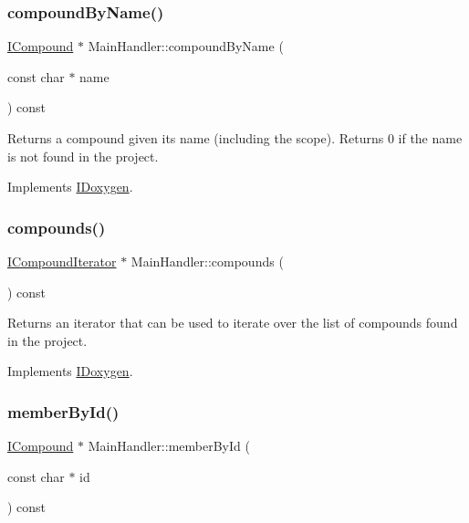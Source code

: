 \mbox{\label{class_main_handler_acd8c995e041bda4396f562da9fb44a91}} 
\subsubsection{\texorpdfstring{compoundByName()}{compoundByName()}}
{\footnotesize\ttfamily \mbox{\hyperlink{class_i_compound}{I\+Compound}} $\ast$ Main\+Handler\+::compound\+By\+Name (\begin{DoxyParamCaption}\item[{const char $\ast$}]{name }\end{DoxyParamCaption}) const\hspace{0.3cm}{\ttfamily [virtual]}}

Returns a compound given its name (including the scope). Returns 0 if the name is not found in the project. 

Implements \mbox{\hyperlink{class_i_doxygen_a8da2fb55aad2aa941b2c529a5f1361aa}{I\+Doxygen}}.

\mbox{\label{class_main_handler_a194b44299530605b43364905f2868158}} 
\subsubsection{\texorpdfstring{compounds()}{compounds()}}
{\footnotesize\ttfamily \mbox{\hyperlink{class_i_compound_iterator}{I\+Compound\+Iterator}} $\ast$ Main\+Handler\+::compounds (\begin{DoxyParamCaption}{ }\end{DoxyParamCaption}) const\hspace{0.3cm}{\ttfamily [virtual]}}

Returns an iterator that can be used to iterate over the list of compounds found in the project. 

Implements \mbox{\hyperlink{class_i_doxygen_acdee4e3efe347f2d97363fdf80609e6e}{I\+Doxygen}}.

\mbox{\label{class_main_handler_a4455c328872b73a442a8e39fd81fba49}} 
\subsubsection{\texorpdfstring{memberById()}{memberById()}}
{\footnotesize\ttfamily \mbox{\hyperlink{class_i_compound}{I\+Compound}} $\ast$ Main\+Handler\+::member\+By\+Id (\begin{DoxyParamCaption}\item[{const char $\ast$}]{id }\end{DoxyParamCaption}) const\hspace{0.3cm}{\ttfamily [virtual]}}

